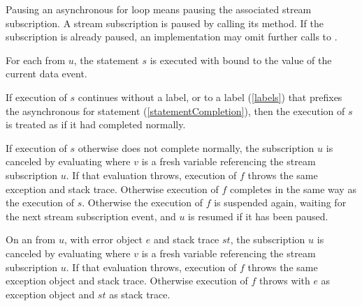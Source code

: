 \documentclass[makeidx]{article}
\begin{document}
{Pausing an asynchronous for loop means pausing the associated stream subscription.
A stream subscription is paused by calling its  method.
If the subscription is already paused, an implementation may omit further calls to .


\LMHash{}%
For each  from $u$,
the statement $s$ is executed with \id{} bound to the value of the current data event.


\LMHash{}%
If execution of $s$ continues without a label, or to a label (\ref{labels}) that prefixes the asynchronous for statement (\ref{statementCompletion}), then the execution of $s$ is treated as if it had completed normally.

If execution of $s$ otherwise does not complete normally, the subscription $u$ is canceled by evaluating  where $v$ is a fresh variable referencing the stream subscription $u$.
If that evaluation throws,
execution of $f$ throws the same exception and stack trace.
Otherwise execution of $f$ completes in the same way as the execution of $s$.
Otherwise the execution of $f$ is suspended again, waiting for the next stream subscription event, and $u$ is resumed if it has been paused.

\LMHash{}%
On an  from $u$,
with error object $e$ and stack trace $st$,
the subscription $u$ is canceled by evaluating 
where $v$ is a fresh variable referencing the stream subscription $u$.
If that evaluation throws,
execution of $f$ throws the same exception object and stack trace.
Otherwise execution of $f$ throws with $e$ as exception object and $st$ as stack trace.

}
\end{document}
